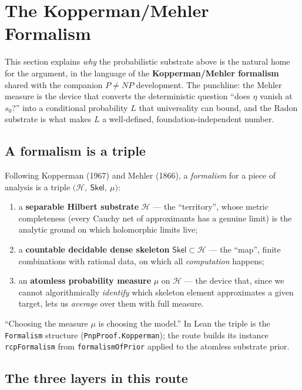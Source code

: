 \documentclass[11pt,a4paper]{article}
\theoremstyle{definition}
\begin{document}
\section{The Kopperman/Mehler Formalism}\label{sec:kopperman}

This section explains \emph{why} the probabilistic substrate above is the natural home for
the argument, in the language of the \textbf{Kopperman/Mehler formalism} shared with the
companion \(P\neq NP\) development. The punchline: the Mehler measure is the device that
converts the deterministic question ``does \(\eta\) vanish at \(s_0\)?'' into a conditional
probability \(L\) that universality can bound, and the Radon substrate is what makes \(L\)
a well-defined, foundation-independent number.

\subsection{A formalism is a triple}\label{sec:triple}

Following Kopperman (1967) and Mehler (1866), a \emph{formalism} for a piece of analysis is
a triple \(\bigl(\mathcal{H},\ \mathsf{Skel},\ \mu\bigr)\):
\begin{enumerate}
  \item a \textbf{separable Hilbert substrate} \(\mathcal{H}\) --- the ``territory'', whose
        metric completeness (every Cauchy net of approximants has a genuine limit) is the
        analytic ground on which holomorphic limits live;
  \item a \textbf{countable decidable dense skeleton} \(\mathsf{Skel}\subset\mathcal{H}\) ---
        the ``map'', finite combinations with rational data, on which all \emph{computation}
        happens;
  \item an \textbf{atomless probability measure} \(\mu\) on \(\mathcal{H}\) --- the device
        that, since we cannot algorithmically \emph{identify} which skeleton element
        approximates a given target, lets us \emph{average} over them with full measure.
\end{enumerate}
``Choosing the measure \(\mu\) is choosing the model.'' In Lean the triple is the
\texttt{Formalism} structure (\texttt{PnpProof.Kopperman}); the route builds its instance
\texttt{rcpFormalism} from \texttt{formalismOfPrior} applied to the atomless substrate prior.

\subsection{The three layers in this route}\label{sec:layers}
\end{document}
